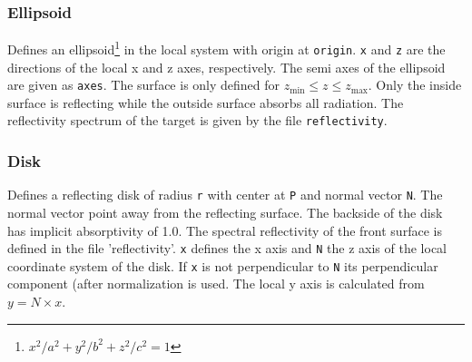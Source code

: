 \documentclass[10pt,a4paper,titlepage]{article}
\begin{document}
\subsubsection{Ellipsoid}











\vspace{0.25cm}
Defines an ellipsoid\footnote{${x^2}/{a^2}+{y^2}/{b^2}+{z^2}/{c^2}=1$} in the local system with origin at {\tt origin}. {\tt x} and {\tt z} are the directions of the local x and z axes, respectively. The semi axes of the ellipsoid are given as {\tt axes}. The surface is only defined for $z_\mathrm{min} \leq z \leq z_\mathrm{max}$. Only the inside surface is reflecting while the outside surface absorbs all radiation. The reflectivity spectrum of the target is given by the file {\tt reflectivity}.

\subsubsection{Disk}









\vspace{0.25cm}
Defines a reflecting disk of radius {\tt r} with center at {\tt P} and normal vector {\tt N}. The normal vector point away from the reflecting surface. The backside of the disk has implicit absorptivity of 1.0. The spectral reflectivity of the front surface is defined in the file 'reflectivity'. {\tt x} defines the x axis and {\tt N} the z axis of the local coordinate system of the disk. If {\tt x} is not perpendicular to {\tt N} its perpendicular component (after normalization is used. The local y axis is calculated from $y = N \times x$.
\end{document}
